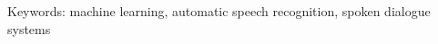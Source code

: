 \documentclass[12pt,a4paper]{report}
\let\openright=\clearpage
\def\chapwithtoc#1{
\chapter*{#1}
\addcontentsline{toc}{chapter}{#1}
}
\begin{document}
{%




Keywords:
machine learning, automatic speech recognition, spoken dialogue systems

\vss}

\newpage


\openright
\pagestyle{plain}
\setcounter{page}{1}
\tableofcontents








% 





\listoftables






\openright
\end{document}
